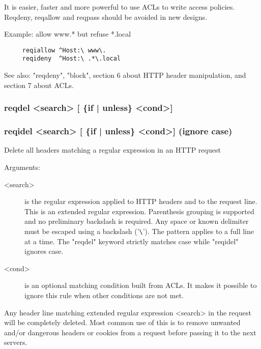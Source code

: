   It is easier, faster and more powerful to use ACLs to write access policies.
  Reqdeny, reqallow and reqpass should be avoided in new designs.

  Example: allow www.* but refuse *.local
\begin{verbatim}
     reqiallow ^Host:\ www\.
     reqideny  ^Host:\ .*\.local
\end{verbatim}

  See also: "reqdeny", "block", section 6 about HTTP header manipulation, and
            section 7 about ACLs.

\subsubsection[reqdel]{reqdel  <search> [ \{if | unless\} <cond>]}
\subsubsection[reqidel]{reqidel <search> [ \{if | unless\} <cond>]  (ignore case)}


  Delete all headers matching a regular expression in an HTTP request


  Arguments:

\begin{description}
\item[<search>]  is the regular expression applied to HTTP headers and to the
              request line. This is an extended regular expression. Parenthesis
              grouping is supported and no preliminary backslash is required.
              Any space or known delimiter must be escaped using a backslash
              ('\verb|\|'). The pattern applies to a full line at a time. The "reqdel"
              keyword strictly matches case while "reqidel" ignores case.

\item[<cond>] is an optional matching condition built from ACLs. It makes it
              possible to ignore this rule when other conditions are not met.
\end{description}

  Any header line matching extended regular expression <search> in the request
  will be completely deleted. Most common use of this is to remove unwanted
  and/or dangerous headers or cookies from a request before passing it to the
  next servers.

